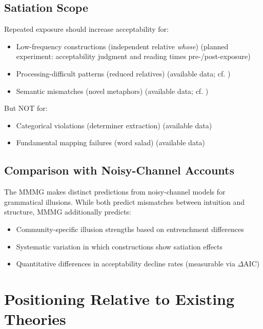\documentclass[12pt]{article}
\begin{document}
\subsection{Satiation Scope}

Repeated exposure should increase acceptability for:
\begin{itemize}
\item Low-frequency constructions (independent relative \textit{whose}) (planned experiment: acceptability judgment and reading times pre-/post-exposure)
\item Processing-difficult patterns (reduced relatives) (available data; cf. \parencite{snyder2000grammaticality,hofmeister2013processing})
\item Semantic mismatches (novel metaphors) (available data; cf. \parencite{giora1997understanding})
\end{itemize}

But NOT for:
\begin{itemize}
\item Categorical violations (determiner extraction) (available data)
\item Fundamental mapping failures (word salad) (available data)
\end{itemize}

\subsection{Comparison with Noisy-Channel Accounts}

The MMMG makes distinct predictions from noisy-channel models \parencite{gibson2013} for grammatical illusions. While both predict mismatches between intuition and structure, MMMG additionally predicts:
\begin{itemize}
\item Community-specific illusion strengths based on entrenchment differences
\item Systematic variation in which constructions show satiation effects
\item Quantitative differences in acceptability decline rates (measurable via $\Delta \text{AIC}$)
\end{itemize}

\section{Positioning Relative to Existing Theories}
\end{document}
